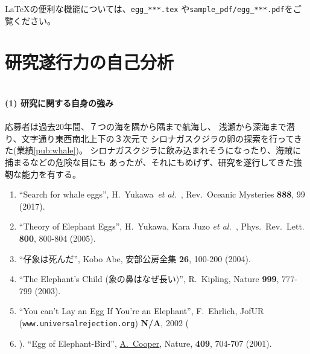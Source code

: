 \documentclass[11pt,a4j,dvipdfmx]{jarticle} 					%
\newcommand{\研究課題名}{象の卵}
\newcommand{\研究機関名}{逢坂大学}
\newcommand{\研究代表者氏名}{湯川秀樹}
\newcommand{\paper}[6]{%
	\item ``#1'', #2, #3 {\bf #4}, #5 (#6).			%
}
\newcommand{\etal}{\textit{et al.\ }}
\newcommand{\yukawa}{H.~Yukawa}					%
\newcommand{\prl}{Phys.\ Rev.\ Lett.\ }		%
\begin{document}
	\LaTeX の便利な機能については、\texttt{egg\_***.tex} や\texttt{sample\_pdf/egg\_***.pdf}をご覧ください。




\section{研究遂行力の自己分析}

\SelfReviewInstructions\\%
\noindent
\textbf{(1) 研究に関する自身の強み}\\
\PapersInstructions\\ %
	応募者は過去20年間、７つの海を隅から隅まで航海し、
	浅瀬から深海まで潜り、文字通り東西南北上下の３次元で
	シロナガスクジラの卵の探索を行ってきた(業績\ref{pub:whale})。
	シロナガスクジラに飲み込まれそうになったり、海賊に捕まるなどの危険な目にも
	あったが、それにもめげず、研究を遂行してきた強靭な能力を有する。
	\begin{enumerate}
		\paper{Search for whale eggs}{\yukawa\ \etal}{Rev.\ Oceanic Mysteries}{888}{99}{2017}
			\label{pub:whale}
				
		\paper{Theory of Elephant Eggs}{\yukawa, Kara Juzo \etal}{\prl}{800}{800-804}{2005}
			\label{pub:theoegg}
				
		\paper{仔象は死んだ}{Kobo Abe}{安部公房全集}{26}{100-200}{2004}
		
		\paper{The Elephant's Child (象の鼻はなぜ長い)}{R.~Kipling}{Nature}{999}{777-799}{2003}

		\paper{You can't Lay an Egg If You're an Elephant}{F.~Ehrlich}
			{JofUR\\({\tt www.universalrejection.org})}{{\bf N/A}}{2002}
		
		\item ``Egg of Elephant-Bird'', 
				\underline{A.~Cooper},
				Nature, {\bf 409}, 704-707 (2001).	%
	\end{enumerate}
\end{document}
